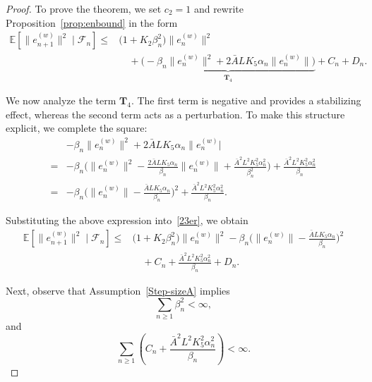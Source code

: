 \documentclass{article}
\begin{document}
\begin{proof}
To prove the theorem, we set $c_2 = 1$ and rewrite
Proposition~\ref{prop:enbound} in the form
\begin{equation}
\begin{split}
    \mathbb{E}\!\left[\|e_{n+1}^{(w)}\|^2 \mid \mathcal{F}_n\right]
    \le{}&
    \big(1 + K_2 \beta_n^2\big)\|e_n^{(w)}\|^2
    \\ &\quad
    +
    \underbrace{
    \Big(
    -\beta_n \|e_n^{(w)}\|^2
    +
    2\bar{A} L K_5 \alpha_n \|e_n^{(w)}\|
    \Big)
    }_{\mathbf{T}_4}
    + C_n + D_n .
\end{split}
\label{23er}
\end{equation}

We now analyze the term $\mathbf{T}_4$. The first term is negative and provides a stabilizing effect, whereas the second term acts as a perturbation. To make this structure explicit, we complete the square:
\begin{equation}
\begin{split}
    &-\beta_n \|e_n^{(w)}\|^2
    +
    2\bar{A} L K_5 \alpha_n \|e_n^{(w)}|
    \\[0.2em]
    ={}&
    -\beta_n
    \Bigg(
    \|e_n^{(w)}\|^2
    -
    \frac{2\bar{A} L K_5 \alpha_n}{\beta_n}
    \|e_n^{(w)}\|
    +
    \frac{\bar{A}^2 L^2 K_5^2 \alpha_n^2}{\beta_n^2}
    \Bigg)
    +
    \frac{\bar{A}^2 L^2 K_5^2 \alpha_n^2}{\beta_n}
    \\[0.2em]
    ={}&
    -\beta_n
    \Bigg(
    \|e_n^{(w)}\|
    -
    \frac{\bar{A} L K_5 \alpha_n}{\beta_n}
    \Bigg)^2
    +
    \frac{\bar{A}^2 L^2 K_5^2 \alpha_n^2}{\beta_n}.
\end{split}
\end{equation}

Substituting the above expression into~\eqref{23er}, we obtain
\begin{equation}
\begin{split}
    \mathbb{E}\!\left[\|e_{n+1}^{(w)}\|^2 \mid \mathcal{F}_n\right]
    \le{}&
    \big(1 + K_2 \beta_n^2 \big)\|e_n^{(w)}\|^2
    -
    \beta_n
    \Bigg(
    \|e_n^{(w)}\|
    -
    \frac{\bar{A} L K_5 \alpha_n}{\beta_n}
    \Bigg)^2
    \\ &\quad
    +
    C_n
    +
    \frac{\bar{A}^2 L^2 K_5^2 \alpha_n^2}{\beta_n}
    +
    D_n.
\end{split}
\label{23er1}
\end{equation}

Next, observe that Assumption~\ref{Step-sizeA} implies
\[
\sum_{n \ge 1} \beta_n^2 < \infty,
\]
and
\[
\sum_{n \ge 1}
\left(
C_n
+
\frac{\bar{A}^2 L^2 K_5^2 \alpha_n^2}{\beta_n}
\right)
< \infty .
\]


\end{proof}
\end{document}
